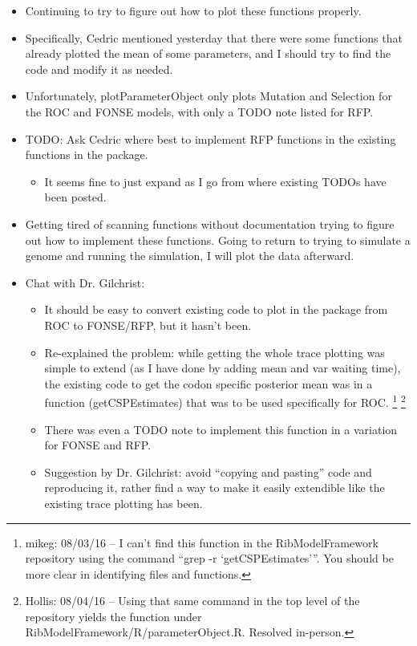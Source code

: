 \documentclass[12pt,hyperref]{labbook}
\begin{document}
\begin{itemize}
    \item Continuing to try to figure out how to plot these functions properly.
    \item Specifically, Cedric mentioned yesterday that there were some functions that already plotted the mean of some parameters, and I should try to find the code and modify it as needed.
    \item Unfortunately, plotParameterObject only plots Mutation and Selection for the ROC and FONSE models, with only a TODO note listed for RFP.
    \item TODO: Ask Cedric where best to implement RFP functions in the existing functions in the package.
    \begin{itemize}
        \item It seems fine to just expand as I go from where existing TODOs have been posted.
    \end{itemize}
    \item Getting tired of scanning functions without documentation trying to figure out how to implement these functions.
    Going to return to trying to simulate a genome and running the simulation, I will plot the data afterward.
    \item Chat with Dr. Gilchrist:
    \begin{itemize}
        \item It should be easy to convert existing code to plot in the package from ROC to FONSE/RFP, but it hasn't been.
        \item Re-explained the problem: while getting the whole trace plotting was simple to extend (as I have done by adding mean and var waiting time), the existing code to get the codon specific posterior mean was in a function (getCSPEstimates) that was to be used specifically for ROC.
            \footnote{mikeg: 08/03/16 -- I can't find this function in the RibModelFramework repository using the command \enquote{grep -r \enquote{getCSPEstimates}}.
            You should be more clear in identifying files and functions.}
            \footnote{Hollis: 08/04/16 -- Using that same command in the top level of the repository yields the function under RibModelFramework/R/parameterObject.R. 
            Resolved in-person.}
        \item There was even a TODO note to implement this function in a variation for FONSE and RFP.
        \item Suggestion by Dr. Gilchrist: avoid \enquote{copying and pasting} code and reproducing it, rather find a way to make it easily extendible like the existing trace plotting has been.

\end{itemize}
\end{itemize}
\end{document}

